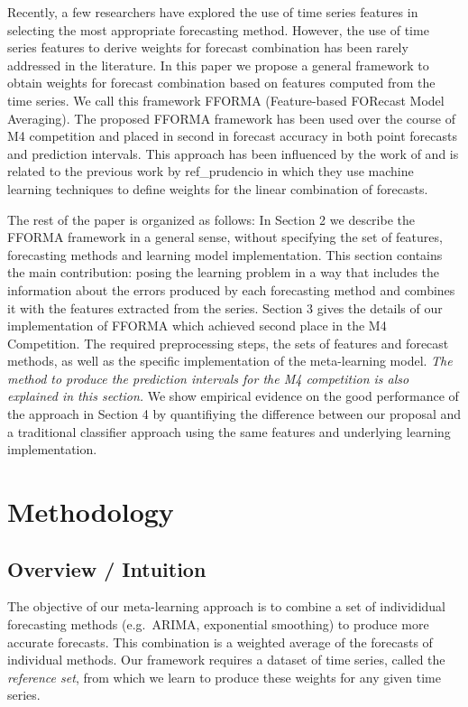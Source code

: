 \documentclass[11pt,a4paper,]{article}
\theoremstyle{definition}
\theoremstyle{definition}
\theoremstyle{definition}
\theoremstyle{remark}
\begin{document}
Recently, a few researchers have explored the use of time series
features in selecting the most appropriate forecasting method. However,
the use of time series features to derive weights for forecast
combination has been rarely addressed in the literature. In this paper
we propose a general framework to obtain weights for forecast
combination based on features computed from the time series. We call
this framework FFORMA (Feature-based FORecast Model Averaging). The
proposed FFORMA framework has been used over the course of M4
competition and placed in second in forecast accuracy in both point
forecasts and prediction intervals. This approach has been influenced by
the work of \textcite{fforms} and is related to the previous work by
ref\_prudencio in which they use machine learning techniques to define
weights for the linear combination of forecasts.

The rest of the paper is organized as follows: In Section 2 we describe
the FFORMA framework in a general sense, without specifying the set of
features, forecasting methods and learning model implementation. This
section contains the main contribution: posing the learning problem in a
way that includes the information about the errors produced by each
forecasting method and combines it with the features extracted from the
series. Section 3 gives the details of our implementation of FFORMA
which achieved second place in the M4 Competition. The required
preprocessing steps, the sets of features and forecast methods, as well
as the specific implementation of the meta-learning model. \emph{The
method to produce the prediction intervals for the M4 competition is
also explained in this section.} We show empirical evidence on the good
performance of the approach in Section 4 by quantifiying the difference
between our proposal and a traditional classifier approach using the
same features and underlying learning implementation.

\section{Methodology}\label{methodology}

\subsection{Overview / Intuition}\label{overview-intuition}

The objective of our meta-learning approach is to combine a set of
individidual forecasting methods (e.g.~ARIMA, exponential smoothing) to
produce more accurate forecasts. This combination is a weighted average
of the forecasts of individual methods. Our framework requires a dataset
of time series, called the \emph{reference set}, from which we learn to
produce these weights for any given time series.
\end{document}
